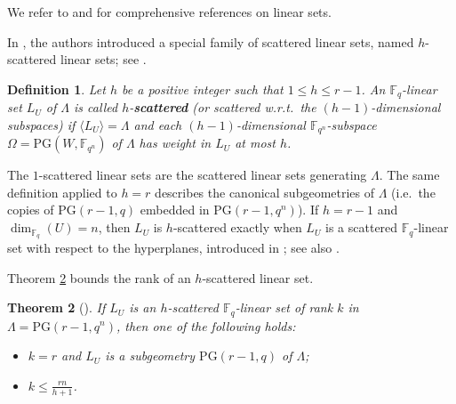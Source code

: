 \documentclass[11pt]{amsart}
\newtheorem{theorem}{Theorem}[section]
\newtheorem{definition}[theorem]{Definition}
\newtheorem{proposition}[theorem]{Proposition}
\newcommand{\fqn}{\mathbb{F}_{q^n}}
\newcommand{\F}{{\mathbb F}}
\newcommand{\la}{\langle}
\newcommand{\ra}{\rangle}
\newcommand{\PG}{\mathrm{PG}}
\begin{document}


We refer to \cite{lavrauw2015field} and \cite{polverino2010linear} for comprehensive references on linear sets.

In \cite{csajbok2021generalising}, the authors introduced a special family of scattered linear sets, named $h$-scattered linear sets; see \cite[Definition 1.1]{csajbok2021generalising}.

\begin{definition}
Let $h$ be a positive integer such that $1\leq h\leq r-1$.
An $\F_q$-linear set $L_U$ of $\Lambda$ is called $h$-\textbf{scattered} (or scattered w.r.t.\ the $(h-1)$-dimensional subspaces) if $\la L_U \ra=\Lambda$ and each $(h-1)$-dimensional $\F_{q^n}$-subspace $\Omega=\PG(W,\fqn)$ of $\Lambda$ has weight in $L_U$ at most $h$.
\end{definition}

The $1$-scattered linear sets are the scattered linear sets generating $\Lambda$. The same definition applied to $h=r$ describes the canonical subgeometries of $\Lambda$ (i.e.\ the copies of $\PG(r-1,q)$ embedded in $\PG(r-1,q^n)$). If $h=r-1$ and $\dim_{\F_q}(U)=n$, then $L_U$ is $h$-scattered exactly when $L_U$ is a scattered $\F_q$-linear set with respect to the hyperplanes, introduced in \cite[Definition 14]{sheekeyVdV}; see also \cite{lunardon2017mrd}.

Theorem \ref{th:bound} bounds the rank of an $h$-scattered linear set.

\begin{theorem}[{\cite[Theorem 2.3]{csajbok2021generalising}}]
\label{th:bound}
If $L_U$ is an $h$-scattered $\F_q$-linear set of rank $k$ in $\Lambda=\PG(r-1,q^n)$, then one of the following holds:
\begin{itemize}
\item $k=r$ and $L_U$ is a subgeometry $\PG(r-1,q)$ of $\Lambda$;
\item $k\leq\frac{rn}{h+1}$.
\end{itemize}
\end{theorem}
\end{document}
